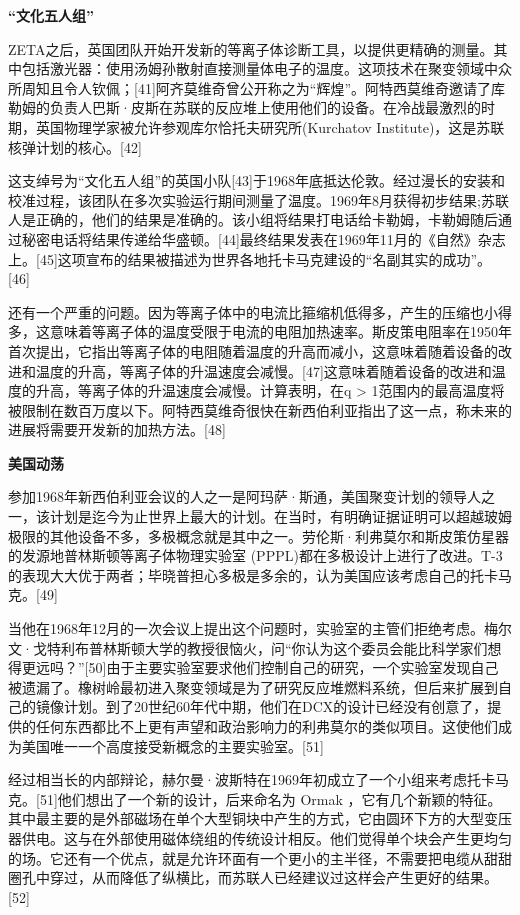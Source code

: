 \textbf{“文化五人组”}

ZETA之后，英国团队开始开发新的等离子体诊断工具，以提供更精确的测量。其中包括激光器：使用汤姆孙散射直接测量体电子的温度。这项技术在聚变领域中众所周知且令人钦佩；[41]阿齐莫维奇曾公开称之为“辉煌”。阿特西莫维奇邀请了库勒姆的负责人巴斯·皮斯在苏联的反应堆上使用他们的设备。在冷战最激烈的时期，英国物理学家被允许参观库尔恰托夫研究所(Kurchatov Institute)，这是苏联核弹计划的核心。[42]

这支绰号为“文化五人组”的英国小队[43]于1968年底抵达伦敦。经过漫长的安装和校准过程，该团队在多次实验运行期间测量了温度。1969年8月获得初步结果;苏联人是正确的，他们的结果是准确的。该小组将结果打电话给卡勒姆，卡勒姆随后通过秘密电话将结果传递给华盛顿。[44]最终结果发表在1969年11月的《自然》杂志上。[45]这项宣布的结果被描述为世界各地托卡马克建设的“名副其实的成功”。[46]

还有一个严重的问题。因为等离子体中的电流比箍缩机低得多，产生的压缩也小得多，这意味着等离子体的温度受限于电流的电阻加热速率。斯皮策电阻率在1950年首次提出，它指出等离子体的电阻随着温度的升高而减小，这意味着随着设备的改进和温度的升高，等离子体的升温速度会减慢。[47]这意味着随着设备的改进和温度的升高，等离子体的升温速度会减慢。计算表明，在q > 1范围内的最高温度将被限制在数百万度以下。阿特西莫维奇很快在新西伯利亚指出了这一点，称未来的进展将需要开发新的加热方法。[48]

\textbf{美国动荡}

参加1968年新西伯利亚会议的人之一是阿玛萨·斯通，美国聚变计划的领导人之一，该计划是迄今为止世界上最大的计划。在当时，有明确证据证明可以超越玻姆极限的其他设备不多，多极概念就是其中之一。劳伦斯·利弗莫尔和斯皮策仿星器的发源地普林斯顿等离子体物理实验室 (PPPL)都在多极设计上进行了改进。T-3的表现大大优于两者；毕晓普担心多极是多余的，认为美国应该考虑自己的托卡马克。[49]

当他在1968年12月的一次会议上提出这个问题时，实验室的主管们拒绝考虑。梅尔文·戈特利布普林斯顿大学的教授很恼火，问“你认为这个委员会能比科学家们想得更远吗？”[50]由于主要实验室要求他们控制自己的研究，一个实验室发现自己被遗漏了。橡树岭最初进入聚变领域是为了研究反应堆燃料系统，但后来扩展到自己的镜像计划。到了20世纪60年代中期，他们在DCX的设计已经没有创意了，提供的任何东西都比不上更有声望和政治影响力的利弗莫尔的类似项目。这使他们成为美国唯一一个高度接受新概念的主要实验室。[51]

经过相当长的内部辩论，赫尔曼·波斯特在1969年初成立了一个小组来考虑托卡马克。[51]他们想出了一个新的设计，后来命名为 Ormak ，它有几个新颖的特征。其中最主要的是外部磁场在单个大型铜块中产生的方式，它由圆环下方的大型变压器供电。这与在外部使用磁体绕组的传统设计相反。他们觉得单个块会产生更均匀的场。它还有一个优点，就是允许环面有一个更小的主半径，不需要把电缆从甜甜圈孔中穿过，从而降低了纵横比，而苏联人已经建议过这样会产生更好的结果。[52]

